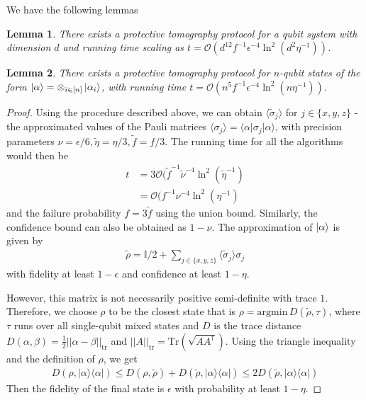\documentclass[]{article}
\newtheorem{lemma}{Lemma}
\newcommand{\cO}{\mathcal O}
\newcommand*{\xo}{\otimes}
\newcommand*{\I}{\mathbb I}
\newcommand*{\E}[1]{\langle #1 \rangle}
\newcommand{\Exp}[3]{\langle #1 \vert #2 \vert #3 \rangle}
\begin{document}
We have the following lemmas
\begin{lemma}
    There exists a protective tomography protocol for a qubit system with dimension $d$ and running time scaling as $t = \cO (d^{12} f^{-1} \epsilon^{-4} \ln^2(d^{2}\eta^{-1}))$.
\end{lemma}

\begin{lemma}
    There exists a protective tomography protocol for $n$-qubit states of the form $\ket{\alpha} = \xo_{i \in [n]} \ket{\alpha_i}$, with running time $t = \cO (n^{5} f^{-1} \epsilon^{-4} \ln^2(n\eta^{-1}))$.
\end{lemma}

\begin{proof}
    Using the procedure described above, we can obtain $\E{\tilde \sigma_j}$ for $j \in \{x, y, z\}$ - the approximated values of the Pauli matrices $\E{\sigma_j} = \Exp{\alpha}{\sigma_j}{\alpha}$, with precision parameters $\nu = \epsilon/6, \tilde \eta = \eta/3, \tilde f = f/3$. The running time for all the algorithms would then be
    \begin{align}
        t &= 3 \cO (\tilde f^{-1}\tilde \nu^{-4} \ln^2(\tilde \eta^{-1}) \\
        &= \cO (f^{-1}\nu^{-4} \ln^2(\eta^{-1})
    \end{align}
    and the failure probability $f = 3\tilde f$ using the union bound. Similarly, the confidence bound can also be obtained as $1 - \nu$. The approximation of $\ket{\alpha}$ is given by
    \begin{align}
        \tilde \rho = \I/2 + \sum_{j \in \{x,y,z\}} \E{\tilde \sigma_j}\sigma_j
    \end{align}
    with fidelity at least $1 - \epsilon$ and confidence at least $1 - \eta$.

    However, this matrix is not necessarily positive semi-definite with trace $1$. Therefore, we choose $\rho$ to be the closest state that is $\rho = \text{argmin}\, D(\tilde \rho, \tau)$, where $\tau$ runs over all single-qubit mixed states and $D$ is the trace distance $D(\alpha, \beta) = \frac{1}{2} ||\alpha - \beta||_{\text{tr}}$ and $||A||_{\text{tr}} = \text{Tr}(\sqrt{AA^\dagger})$. Using the triangle inequality and the definition of $\rho$, we get
    \begin{align}
        D(\rho, |\alpha\rangle\langle\alpha|) \leq D(\rho, \tilde\rho) + D(\tilde\rho, |\alpha\rangle\langle\alpha|) \leq 2D(\tilde\rho, |\alpha\rangle\langle\alpha|)
    \end{align}
    Then the fidelity of the final state is $\epsilon$ with probability at least $1 - \eta$.
\end{proof}
\end{document}
